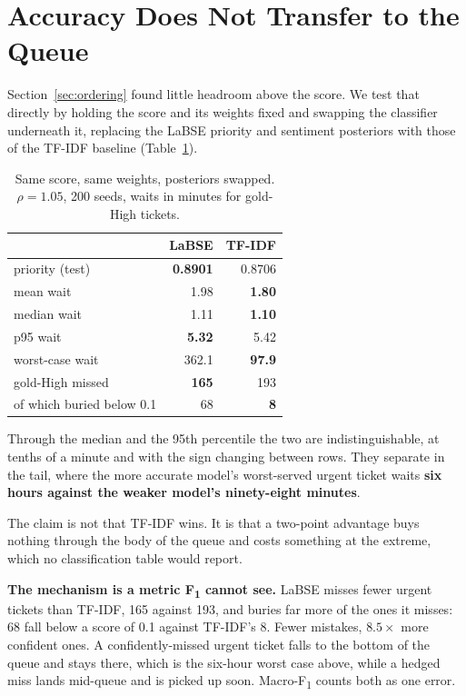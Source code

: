 \section{Accuracy Does Not Transfer to the Queue}
\label{sec:accuracy}

Section~\ref{sec:ordering} found little headroom above the score. We test that
directly by holding the score and its weights fixed and swapping the classifier
underneath it, replacing the LaBSE priority and sentiment posteriors with those
of the TF-IDF baseline (Table~\ref{tab:subst}).

\begin{table}[!tb]
\caption{Same score, same weights, posteriors swapped. $\rho=1.05$, 200 seeds,
waits in minutes for gold-High tickets.}
\label{tab:subst}
\centering
\small
\begin{tabular}{@{}lrr@{}}
\toprule
 & LaBSE & TF-IDF \\
\midrule
priority \macrof{} (test) & \textbf{0.8901} & 0.8706 \\
\midrule
mean wait      & 1.98 & \textbf{1.80} \\
median wait    & 1.11 & \textbf{1.10} \\
p95 wait       & \textbf{5.32} & 5.42 \\
worst-case wait & 362.1 & \textbf{97.9} \\
\midrule
gold-High missed & \textbf{165} & 193 \\
\quad of which buried below 0.1 & 68 & \textbf{8} \\
\bottomrule
\end{tabular}
\end{table}

Through the median and the 95th percentile the two are indistinguishable, at
tenths of a minute and with the sign changing between rows. They separate in the
tail, where the more accurate model's worst-served urgent ticket waits
\textbf{six hours against the weaker model's ninety-eight minutes}.

The claim is not that TF-IDF wins. It is that a two-point \macrof{} advantage
buys nothing through the body of the queue and costs something at the extreme,
which no classification table would report.

\textbf{The mechanism is a metric F\textsubscript{1} cannot see.} LaBSE misses
fewer urgent tickets than TF-IDF, 165 against 193, and buries far more of the
ones it misses: 68 fall below a score of 0.1 against TF-IDF's 8. Fewer mistakes,
$8.5\times$ more confident ones. A confidently-missed urgent ticket falls to the
bottom of the queue and stays there, which is the six-hour worst case above,
while a hedged miss lands mid-queue and is picked up soon. Macro-F\textsubscript{1}
counts both as one error.

